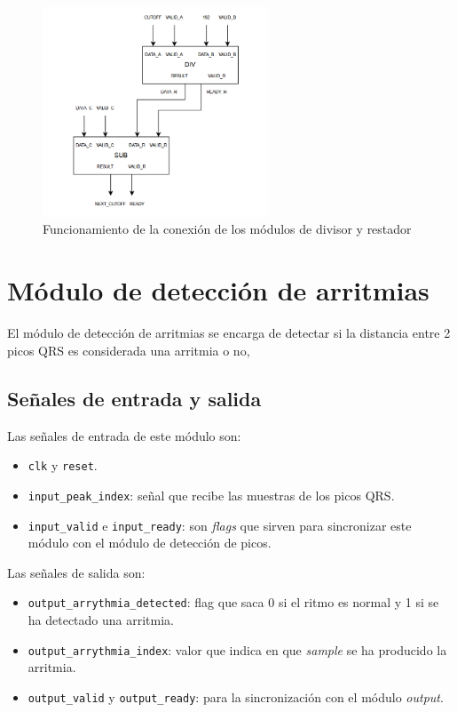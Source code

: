 \begin{figure}[h!]
    \centering
    \includegraphics[width=0.6\textwidth]{./Images/img_implementacion_hw/DiagramaDivisorrestador.png}
    \caption{Funcionamiento de la conexión de los módulos de divisor y restador}
    \label{fig:divisorrestador}
\end{figure}

\section{Módulo de detección de arritmias}

El módulo de detección de arritmias se encarga de detectar si la distancia entre 2 picos QRS es considerada una arritmia o no,
 
\subsection{Señales de entrada y salida}
Las señales de entrada de este módulo son:

\begin{itemize}
    \item \texttt{clk} y \texttt{reset}.
    \item \texttt{input\_peak\_index}: señal que recibe las muestras de los picos QRS.
    \item \texttt{input\_valid} e \texttt{input\_ready}: son \textit{flags} que sirven para sincronizar este módulo con el módulo de detección de picos. 
\end{itemize}
    
Las señales de salida son:

\begin{itemize}
    \item \texttt{output\_arrythmia\_detected}: flag que saca 0 si el ritmo es normal y 1 si se ha detectado una arritmia.
    \item \texttt{output\_arrythmia\_index}: valor que indica en que \textit{sample} se ha producido la arritmia.
    \item \texttt{output\_valid} y \texttt{output\_ready}: para la sincronización con el módulo \textit{output}.
\end{itemize}


